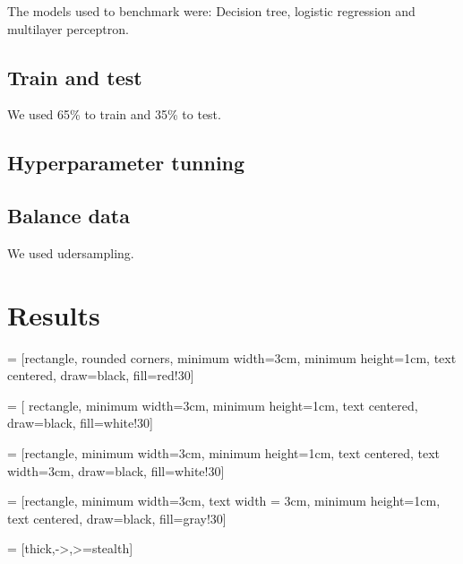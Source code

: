 \documentclass[journal]{IEEEtai}
\begin{document}
The models used to benchmark were: Decision tree, logistic regression and multilayer perceptron.


\subsection{Train and test}

We used 65\% to train and 35\% to test.


\subsection{Hyperparameter tunning}

\subsection{Balance data}


We used udersampling.



\section{Results}




\usetikzlibrary{shapes.geometric, arrows}

 = [rectangle, rounded corners, 
minimum width=3cm, 
minimum height=1cm,
text centered, 
draw=black, 
fill=red!30]

 = [ rectangle, minimum width=3cm, 
minimum height=1cm, text centered, 
draw=black, fill=white!30]

 = [rectangle, 
minimum width=3cm, 
minimum height=1cm, 
text centered, 
text width=3cm, 
draw=black, 
fill=white!30]

 = [rectangle, 
minimum width=3cm, 
text width = 3cm,
minimum height=1cm, 
text centered, 
draw=black, 
fill=gray!30]

 = [thick,->,>=stealth]
\end{document}
